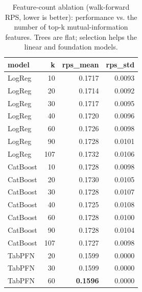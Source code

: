 \begin{table}[t]
  \centering
  \caption{Feature-count ablation (walk-forward RPS, lower is better): performance vs. the number of top-k mutual-information features. Trees are flat; selection helps the linear and foundation models.}
  \label{tab:feature_ablation}
  \begin{tabular}{lrrr}
  \toprule
  model & k & rps\_mean & rps\_std \\
  \midrule
  LogReg & 10 & 0.1717 & 0.0093 \\
  LogReg & 20 & 0.1714 & 0.0092 \\
  LogReg & 30 & 0.1717 & 0.0095 \\
  LogReg & 40 & 0.1720 & 0.0096 \\
  LogReg & 60 & 0.1726 & 0.0098 \\
  LogReg & 90 & 0.1728 & 0.0101 \\
  LogReg & 107 & 0.1732 & 0.0106 \\
  CatBoost & 10 & 0.1728 & 0.0098 \\
  CatBoost & 20 & 0.1730 & 0.0105 \\
  CatBoost & 30 & 0.1728 & 0.0107 \\
  CatBoost & 40 & 0.1725 & 0.0108 \\
  CatBoost & 60 & 0.1728 & 0.0100 \\
  CatBoost & 90 & 0.1728 & 0.0104 \\
  CatBoost & 107 & 0.1727 & 0.0098 \\
  TabPFN & 20 & 0.1599 & 0.0000 \\
  TabPFN & 30 & 0.1599 & 0.0000 \\
  TabPFN & 60 & \textbf{0.1596} & 0.0000 \\
  \bottomrule
  \end{tabular}
\end{table}
